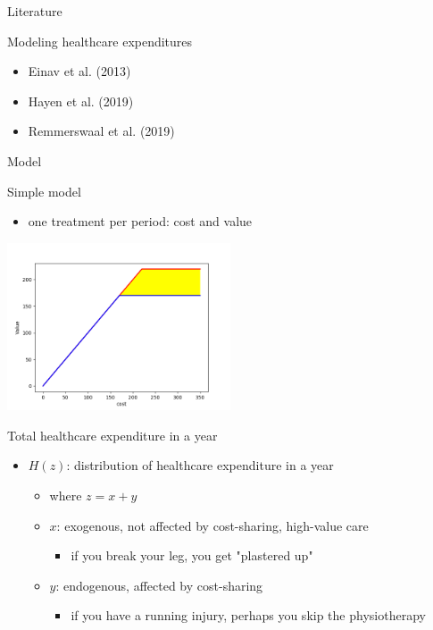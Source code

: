 \documentclass[presentation]{beamer}
\begin{document}
\begin{frame}[label={sec:orgbfe8ad2}]{Literature}
\begin{block}{Modeling healthcare expenditures}
\begin{itemize}
\item Einav et al. (2013)
\item Hayen et al. (2019)
\item Remmerswaal et al. (2019)
\end{itemize}
\end{block}
\end{frame}

\begin{frame}[label={sec:org8b91621}]{Model}
\begin{block}{Simple model}
\begin{itemize}
\item one treatment per period: cost and value
\end{itemize}
\begin{center}
\includegraphics[width=250px]{./deduct.png}
\end{center}
\end{block}

\begin{block}{Total healthcare expenditure in a year}
\begin{itemize}
\item \(H(z)\): distribution of healthcare expenditure in a year
\begin{itemize}
\item where \(z=x+y\)
\item \(x\): exogenous, not affected by cost-sharing, high-value care
\begin{itemize}
\item if you break your leg, you get "plastered up"
\end{itemize}
\item \(y\): endogenous, affected by cost-sharing
\begin{itemize}
\item if you have a running injury, perhaps you skip the physiotherapy
\end{itemize}
\end{itemize}
\end{itemize}
\end{block}


\end{frame}
\end{document}
